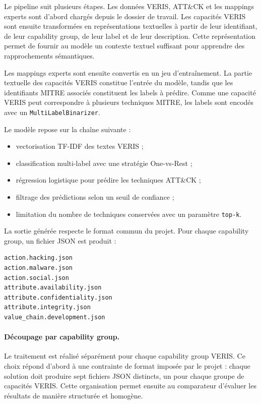 \documentclass[a4paper,12pt]{article}
\begin{document}
Le pipeline suit plusieurs étapes. Les données VERIS, ATT\&CK et les mappings experts sont d'abord chargés depuis le dossier de travail. Les capacités VERIS sont ensuite transformées en représentations textuelles à partir de leur identifiant, de leur capability group, de leur label et de leur description. Cette représentation permet de fournir au modèle un contexte textuel suffisant pour apprendre des rapprochements sémantiques.

Les mappings experts sont ensuite convertis en un jeu d'entraînement. La partie textuelle des capacités VERIS constitue l'entrée du modèle, tandis que les identifiants MITRE associés constituent les labels à prédire. Comme une capacité VERIS peut correspondre à plusieurs techniques MITRE, les labels sont encodés avec un \texttt{MultiLabelBinarizer}.

Le modèle repose sur la chaîne suivante :

\begin{itemize}
    \item vectorisation TF-IDF des textes VERIS ;
    \item classification multi-label avec une stratégie One-vs-Rest ;
    \item régression logistique pour prédire les techniques ATT\&CK ;
    \item filtrage des prédictions selon un seuil de confiance ;
    \item limitation du nombre de techniques conservées avec un paramètre \texttt{top-k}.
\end{itemize}

La sortie générée respecte le format commun du projet. Pour chaque capability group, un fichier JSON est produit :

\begin{verbatim}
action.hacking.json
action.malware.json
action.social.json
attribute.availability.json
attribute.confidentiality.json
attribute.integrity.json
value_chain.development.json
\end{verbatim}

\paragraph{Découpage par capability group.}

Le traitement est réalisé séparément pour chaque capability group VERIS. Ce choix répond d'abord à une contrainte de format imposée par le projet : chaque solution doit produire sept fichiers JSON distincts, un pour chaque groupe de capacités VERIS. Cette organisation permet ensuite au comparateur d'évaluer les résultats de manière structurée et homogène.
\end{document}
